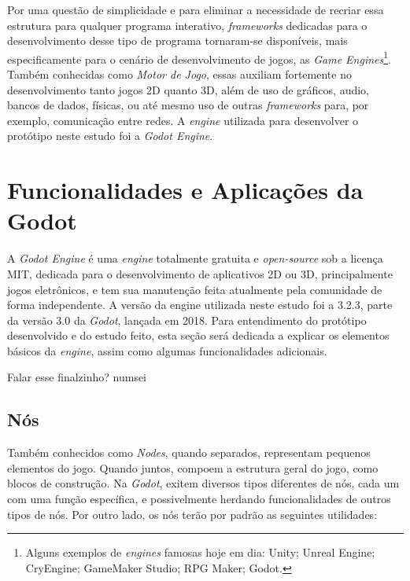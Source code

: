 Por uma questão de simplicidade e para eliminar a necessidade de recriar essa estrutura para qualquer programa interativo, \textit{frameworks} dedicadas para o desenvolvimento desse tipo de programa tornaram-se disponíveis, mais especificamente para o cenário de desenvolvimento de jogos, as \textit{Game Engines}\footnote{
    Alguns exemplos de \textit{engines} famosas hoje em dia: Unity; Unreal Engine; CryEngine; GameMaker Studio; RPG Maker; Godot.
}. Também conhecidas como \textit{Motor de Jogo}, essas auxiliam fortemente no desenvolvimento tanto jogos 2D quanto 3D, além de uso de gráficos, audio, bancos de dados, físicas, ou até mesmo uso de outras \textit{frameworks} para, por exemplo, comunicação entre redes. A \textit{engine} utilizada para desenvolver o protótipo neste estudo foi a \textit{Godot Engine}.

\section{Funcionalidades e Aplicações da Godot}

A \textit{Godot Engine} é uma \textit{engine} totalmente gratuita e \textit{open-source} sob a licença MIT, dedicada para o desenvolvimento de aplicativos 2D ou 3D, principalmente jogos eletrônicos, e tem sua manutenção feita atualmente pela comunidade de forma independente. A versão da engine utilizada neste estudo foi a 3.2.3, parte da versão 3.0 da \textit{Godot}, lançada em 2018. Para entendimento do protótipo desenvolvido e do estudo feito, esta seção será dedicada a explicar os elementos básicos da \textit{engine}, assim como algumas funcionalidades adicionais.

Falar esse finalzinho? numsei

\subsection{Nós}

Também conhecidos como \textit{Nodes}, quando separados, representam pequenos elementos do jogo. Quando juntos, compoem a estrutura geral do jogo, como blocos de construção. Na \textit{Godot}, exitem diversos tipos diferentes de nós, cada um com uma função específica, e possivelmente herdando funcionalidades de outros tipos de nós. Por outro lado, os nós terão por padrão as seguintes utilidades:

